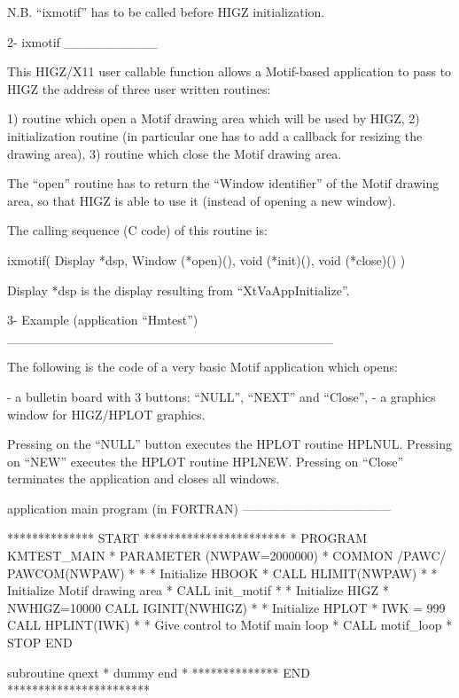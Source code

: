 N.B. ``ixmotif'' has to be called before HIGZ initialization.



2- ixmotif
__________

This HIGZ/X11 user callable function allows a Motif-based application
to pass to HIGZ the address of three user written routines:

   1) routine which open a Motif drawing area which will be used by HIGZ,
   2) initialization routine (in particular one has to add a callback
      for resizing the drawing area),
   3) routine which close the Motif drawing area.

The ``open'' routine has to return the ``Window identifier'' of the Motif
drawing area, so that HIGZ is able to use it (instead of opening a new
window).

The calling sequence (C code) of this routine is:

    ixmotif( Display *dsp, Window (*open)(), void (*init)(), void (*close)() )

Display *dsp is the display resulting from ``XtVaAppInitialize''.



3- Example (application ``Hmtest'')
___________________________________


The following is the code of a very basic Motif application which opens:

- a bulletin board with 3 buttons: ``NULL'', ``NEXT'' and ``Close'',
- a graphics window for HIGZ/HPLOT graphics.

Pressing on the ``NULL'' button executes the HPLOT routine HPLNUL.
Pressing on ``NEW'' executes the HPLOT routine HPLNEW. Pressing on ``Close''
terminates the application and closes all windows.

application main program (in FORTRAN)
------------------------------------

**************  START  ***********************
*
      PROGRAM KMTEST_MAIN
*
      PARAMETER (NWPAW=2000000)
*
      COMMON /PAWC/ PAWCOM(NWPAW)
*
*
*           Initialize HBOOK
*
      CALL HLIMIT(NWPAW)
*
*           Initialize Motif drawing area
*
      CALL init_motif
*
*           Initialize HIGZ
*
      NWHIGZ=10000
      CALL IGINIT(NWHIGZ)
*
*           Initialize HPLOT
*
      IWK = 999
      CALL HPLINT(IWK)
*
*           Give control to Motif main loop
*
      CALL motif_loop
*
      STOP
      END

      subroutine qnext
*     dummy
      end
*
**************   END   ***********************


